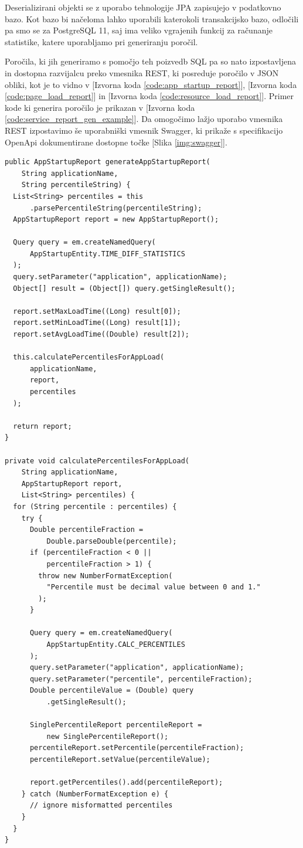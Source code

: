 \documentclass[a4paper, 12pt]{book}
\begin{document}
Deserializirani objekti se z uporabo tehnologije JPA zapisujejo v podatkovno bazo. Kot bazo bi načeloma lahko uporabili katerokoli transakcijsko bazo, odločili pa smo se za PostgreSQL 11, saj ima veliko vgrajenih funkcij za računanje statistike, katere uporabljamo pri generiranju poročil.

Poročila, ki jih generiramo s pomočjo teh poizvedb SQL pa so nato izpostavljena in dostopna razvijalcu preko vmesnika REST, ki posreduje poročilo v JSON obliki, kot je to vidno v [Izvorna koda \ref{code:app_startup_report}],  [Izvorna koda \ref{code:page_load_report}] in  [Izvorna koda \ref{code:resource_load_report}]. Primer kode ki generira poročilo je prikazan v [Izvorna koda \ref{code:service_report_gen_example}]. Da omogočimo lažjo uporabo vmesnika REST izpostavimo še uporabniški vmesnik Swagger, ki prikaže s specifikacijo OpenApi dokumentirane dostopne točke [Slika \ref{img:swagger}].

\begin{lstlisting}[label=code:service_report_gen_example, caption=Pridobivanje poročila o zagonskem času aplikacije]
public AppStartupReport generateAppStartupReport(
    String applicationName,
    String percentileString) {
  List<String> percentiles = this
      .parsePercentileString(percentileString);
  AppStartupReport report = new AppStartupReport();

  Query query = em.createNamedQuery(
      AppStartupEntity.TIME_DIFF_STATISTICS
  );
  query.setParameter("application", applicationName);
  Object[] result = (Object[]) query.getSingleResult();

  report.setMaxLoadTime((Long) result[0]);
  report.setMinLoadTime((Long) result[1]);
  report.setAvgLoadTime((Double) result[2]);

  this.calculatePercentilesForAppLoad(
      applicationName,
      report,
      percentiles
  );

  return report;
}

private void calculatePercentilesForAppLoad(
    String applicationName,
    AppStartupReport report,
    List<String> percentiles) {
  for (String percentile : percentiles) {
    try {
      Double percentileFraction = 
          Double.parseDouble(percentile);
      if (percentileFraction < 0 ||
          percentileFraction > 1) {
        throw new NumberFormatException(
          "Percentile must be decimal value between 0 and 1."
        );
      }
  
      Query query = em.createNamedQuery(
          AppStartupEntity.CALC_PERCENTILES
      );
      query.setParameter("application", applicationName);
      query.setParameter("percentile", percentileFraction);
      Double percentileValue = (Double) query
          .getSingleResult();

      SinglePercentileReport percentileReport = 
          new SinglePercentileReport();
      percentileReport.setPercentile(percentileFraction);
      percentileReport.setValue(percentileValue);

      report.getPercentiles().add(percentileReport);
    } catch (NumberFormatException e) {
      // ignore misformatted percentiles
    }
  }
}
\end{lstlisting} 
\end{document}
